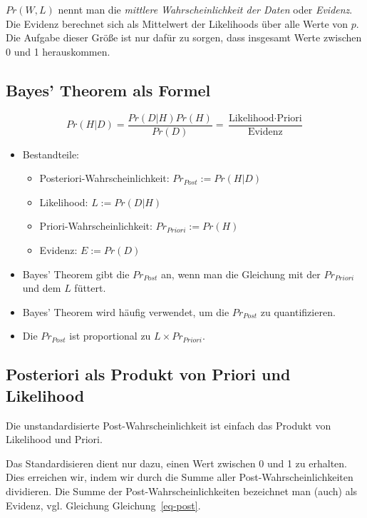 \documentclass[
  a4paper,
  DIV=11]{scrreprt}
\theoremstyle{definition}
\theoremstyle{remark}
\begin{document}
\(Pr(W,L)\) nennt man die \emph{mittlere Wahrscheinlichkeit der Daten}
oder \emph{Evidenz}. Die Evidenz berechnet sich als Mittelwert der
Likelihoods über alle Werte von \(p\). Die Aufgabe dieser Größe ist nur
dafür zu sorgen, dass insgesamt Werte zwischen 0 und 1 herauskommen.

\hypertarget{bayes-theorem-als-formel}{%
\subsection{Bayes' Theorem als Formel}\label{bayes-theorem-als-formel}}

\[Pr(H|D) = \frac{Pr(D|H) Pr(H)}{Pr(D)} = \frac{\text{Likelihood}  \cdot \text{Priori}}{\text{Evidenz}}\]

\begin{itemize}
\item
  Bestandteile:

  \begin{itemize}
  \item
    Posteriori-Wahrscheinlichkeit: \(Pr_{Post} := Pr(H|D)\)
  \item
    Likelihood: \(L := Pr(D|H)\)
  \item
    Priori-Wahrscheinlichkeit: \(Pr_{Priori} := Pr(H)\)
  \item
    Evidenz: \(E := Pr(D)\)
  \end{itemize}
\item
  Bayes' Theorem gibt die \(Pr_{Post}\) an, wenn man die Gleichung mit
  der \(Pr_{Priori}\) und dem \(L\) füttert.
\item
  Bayes' Theorem wird häufig verwendet, um die \(Pr_{Post}\) zu
  quantifizieren.
\item
  Die \(Pr_{Post}\) ist proportional zu \(L \times Pr_{Priori}\).
\end{itemize}

\hypertarget{posteriori-als-produkt-von-priori-und-likelihood}{%
\subsection{Posteriori als Produkt von Priori und
Likelihood}\label{posteriori-als-produkt-von-priori-und-likelihood}}

Die unstandardisierte Post-Wahrscheinlichkeit ist einfach das Produkt
von Likelihood und Priori.

Das Standardisieren dient nur dazu, einen Wert zwischen 0 und 1 zu
erhalten. Dies erreichen wir, indem wir durch die Summe aller
Post-Wahrscheinlichkeiten dividieren. Die Summe der
Post-Wahrscheinlichkeiten bezeichnet man (auch) als Evidenz, vgl.
Gleichung Gleichung~\ref{eq-post}.
\end{document}
